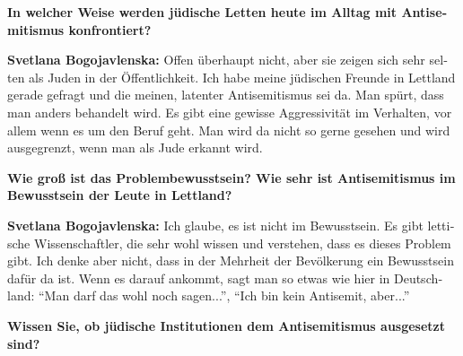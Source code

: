 \begin{otherlanguage}{ngerman}
\textbf{In welcher Weise werden jüdische Letten heute im Alltag mit Antisemitismus konfrontiert?}

\textbf{Svetlana Bogojavlenska:} Offen überhaupt nicht, aber sie zeigen sich sehr selten als Juden in der Öffentlichkeit. Ich habe meine jüdischen Freunde in Lettland gerade gefragt und die meinen, latenter Antisemitismus sei da. Man spürt, dass man anders behandelt wird. Es gibt eine gewisse Aggressivität im Verhalten, vor allem wenn es um den Beruf geht. Man wird da nicht so gerne gesehen und wird ausgegrenzt, wenn man als Jude erkannt wird. 

\textbf{Wie groß ist das Problembewusstsein? Wie sehr ist Antisemitismus im Bewusstsein der Leute in Lettland?}

\textbf{Svetlana Bogojavlenska:} Ich glaube, es ist nicht im Bewusstsein. Es gibt lettische Wissenschaftler, die sehr wohl wissen und verstehen, dass es dieses Problem gibt. Ich denke aber nicht, dass in der Mehrheit der Bevölkerung ein Bewusstsein dafür da ist. Wenn es darauf ankommt, sagt man so etwas wie hier in Deutschland: "`Man darf das wohl noch sagen..."', "`Ich bin kein Antisemit, aber..."' 

\textbf{Wissen Sie, ob jüdische Institutionen dem Antisemitismus ausgesetzt sind?}


\end{otherlanguage}
